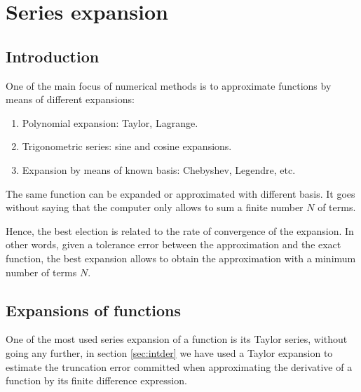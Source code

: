 \chapter{Series expansion} 

\renewcommand{\home}{./Fortran/sources/Foundations/Calculus} 

\section{Introduction} 

One of the main focus of numerical methods is to approximate functions by means of different expansions: 

\begin{enumerate} 
\setlength\itemsep{-0.1cm}
	\item Polynomial expansion: Taylor, Lagrange.
	\item Trigonometric series: sine and cosine expansions. 
	\item Expansion by means of known basis: Chebyshev, Legendre, etc. 
\end{enumerate} 

The same function can be expanded or approximated with different basis.
It goes without saying that the computer only allows to sum a finite number $ N $  of terms. 

Hence, the best election is related to the rate of convergence 
of the expansion. In other words, given a tolerance error between the approximation and the exact function, 
the best expansion allows to obtain the approximation with a minimum number of terms $N$. 




\newpage
\section{Expansions of functions} 
   
One of the most used series expansion of a function is its Taylor series, without going any further, in section \ref{sec:intder} we have used a Taylor expansion to estimate the truncation error committed when approximating the derivative of a function by its finite difference expression.

